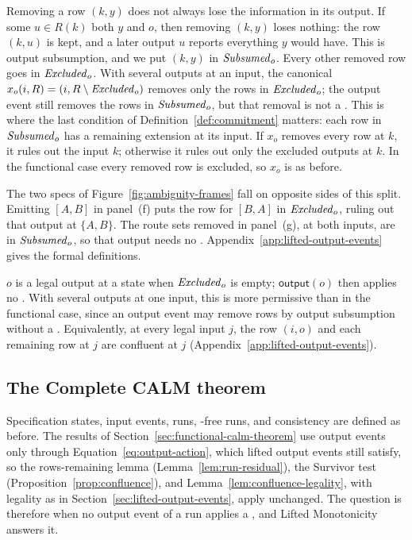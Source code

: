 Removing a row $(k,y)$ does not always lose the information in its output.  If some $u\in R(k)$ \outrel both $y$ and $o$, then removing $(k,y)$ loses nothing: the row $(k,u)$ is kept, and a later output $u$ reports everything $y$
would have.  This is output subsumption, and we put $(k,y)$ in $\mathit{Subsumed}_o$.
Every other removed row goes in $\mathit{Excluded}_o$.  With several outputs at an
input, the canonical \commitment $x_o(i,R)=(i,R\setminus\mathit{Excluded}_o)$ removes
only the rows in $\mathit{Excluded}_o$; the output event still removes the rows in
$\mathit{Subsumed}_o$, but that removal is not a \commitment.  This is where the last
condition of Definition~\ref{def:commitment} matters: each row in
$\mathit{Subsumed}_o$ has a remaining extension at its input.  If $x_o$ removes
every row at $k$, it rules out the input $k$; otherwise it rules out only the
excluded outputs at $k$.  In the functional case every removed row is excluded,
so $x_o$ is as before.

The two specs of Figure~\ref{fig:ambiguity-frames} fall on opposite sides of this split.  Emitting $[A,B]$ in panel~(f) puts the row for $[B,A]$ in $\mathit{Excluded}_o$, ruling out that output at $\{A,B\}$.  The route sets removed in panel~(g), at both inputs, are in $\mathit{Subsumed}_o$, so that output needs no \commitment.
Appendix~\ref{app:lifted-output-events} gives the formal definitions.

$o$ is a legal output at a state when $\mathit{Excluded}_o$ is empty;
$\mathsf{output}(o)$ then applies no \commitment.  With several
outputs at one input, this is more permissive than in the functional case,
since an output event may remove rows by output subsumption without a
\commitment.  Equivalently, at every legal input $j$, the row $(i,o)$ and each remaining row at $j$ are confluent at $j$ (Appendix~\ref{app:lifted-output-events}).

\subsection{The Complete CALM theorem}
\label{sec:complete-calm-theorem}

Specification states, input events, runs, \commitment-free runs, and
consistency are defined as before.  The results of Section~\ref{sec:functional-calm-theorem}
use output events only through Equation~\ref{eq:output-action}, which lifted
output events still satisfy, so the rows-remaining lemma
(Lemma~\ref{lem:run-residual}), the Survivor test
(Proposition~\ref{prop:confluence}), and
Lemma~\ref{lem:confluence-legality}, with legality as in
Section~\ref{sec:lifted-output-events}, apply unchanged.  The question is
therefore when no output event of a run applies a \commitment, and Lifted
Monotonicity answers it.

